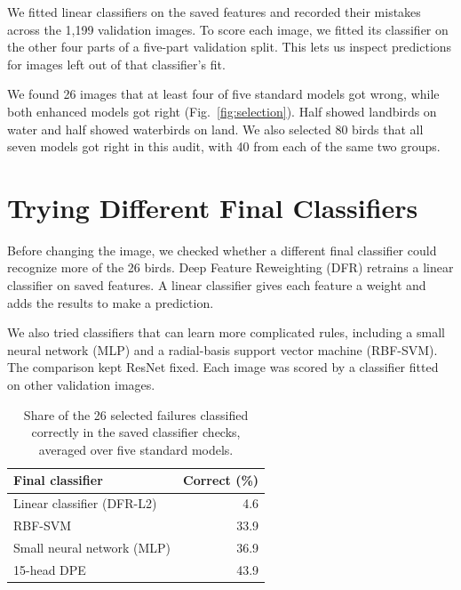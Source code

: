 \documentclass[runningheads]{llncs}
\makeatletter
\newenvironment{methodfigure}{\par\medskip\noindent
  \begin{minipage}{\linewidth}\centering\def\@captype{figure}}
  {\end{minipage}\par\medskip}
\makeatother
\begin{document}
We fitted linear classifiers on the saved features and recorded their
mistakes across the 1,199 validation images. To score each image,
we fitted its classifier on the other four parts of a five-part
validation split. This lets us inspect predictions for images left
out of that classifier's fit.

We found 26 images that at least four of five standard models got wrong,
while both enhanced models got right (Fig.~\ref{fig:selection}).
Half showed landbirds on water and half showed waterbirds on land.
We also selected 80 birds that all seven models got right in this audit,
with 40 from each of the same two groups.

\begin{methodfigure}
\resizebox{\linewidth}{!}{}
\caption{How we selected the recurring failures. The enhanced models
gave us examples of the same birds being classified correctly.}
\label{fig:selection}
\end{methodfigure}

\newpage
\section{Trying Different Final Classifiers}

Before changing the image, we checked whether a different final
classifier could recognize more of the 26 birds. Deep Feature
Reweighting (DFR) retrains a linear classifier on saved features.
A linear classifier gives each feature a weight and adds the results
to make a prediction.

We also tried classifiers that can learn more complicated rules,
including a small neural network (MLP) and a radial-basis support
vector machine (RBF-SVM). The comparison kept ResNet fixed.
Each image was scored by a classifier fitted on other validation images.

\begin{methodfigure}
\resizebox{\linewidth}{!}{}
\caption{Change the final classifier while keeping its input features
fixed. The table also includes the RBF-SVM comparison.}
\label{fig:readouts}
\end{methodfigure}

\begin{table}[H]
\centering
\caption{Share of the 26 selected failures classified correctly in
the saved classifier checks, averaged over five standard models.}
\label{tab:readouts}
\small
\begin{tabular}{@{}lr@{}}
\toprule
Final classifier & Correct (\%)\\
\midrule
Linear classifier (DFR-L2) & 4.6\\
RBF-SVM & 33.9\\
Small neural network (MLP) & 36.9\\
15-head DPE & 43.9\\
\bottomrule
\end{tabular}
\end{table}
\end{document}
